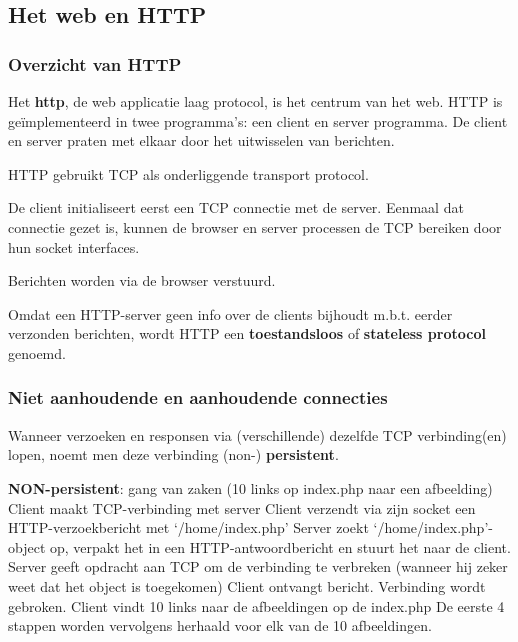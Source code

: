 \subsection{Het web en HTTP}

\subsubsection{Overzicht van HTTP}

Het \textbf{\acrfull{http}}, de web applicatie laag protocol, is het centrum van het web. HTTP is geïmplementeerd in twee programma’s: een client en server programma. De client en server praten met elkaar door het uitwisselen van berichten.

\noindent HTTP gebruikt TCP als onderliggende transport protocol. 

\noindent De client initialiseert eerst een TCP connectie met de server. Eenmaal dat connectie gezet is, kunnen de browser en server processen de TCP bereiken door hun socket interfaces.

\noindent Berichten worden via de browser verstuurd.

\noindent Omdat een HTTP-server geen info over de clients bijhoudt m.b.t. eerder verzonden berichten, wordt HTTP een \textbf{toestandsloos} of \textbf{stateless protocol} genoemd.

\newpage

\subsubsection{Niet aanhoudende en aanhoudende connecties}


Wanneer verzoeken en responsen via (verschillende) dezelfde TCP verbinding(en) lopen, noemt men deze verbinding (non-) \textbf{persistent}.

\noindent \textbf{NON-persistent}: gang van zaken (10 links op index.php naar een afbeelding)
\be
\itf Client maakt TCP-verbinding met server
\itf Client verzendt via zijn socket een HTTP-verzoekbericht met ‘/home/index.php’
\itf Server zoekt ‘/home/index.php’-object op, verpakt het in een HTTP-antwoordbericht en stuurt het naar de client.
\itf Server geeft opdracht aan TCP om de verbinding te verbreken (wanneer hij zeker weet dat het object is toegekomen)
\itf Client ontvangt bericht. Verbinding wordt gebroken. Client vindt 10 links naar de afbeeldingen op de index.php
\itf De eerste 4 stappen worden vervolgens herhaald voor elk van de 10 afbeeldingen.
\ee

